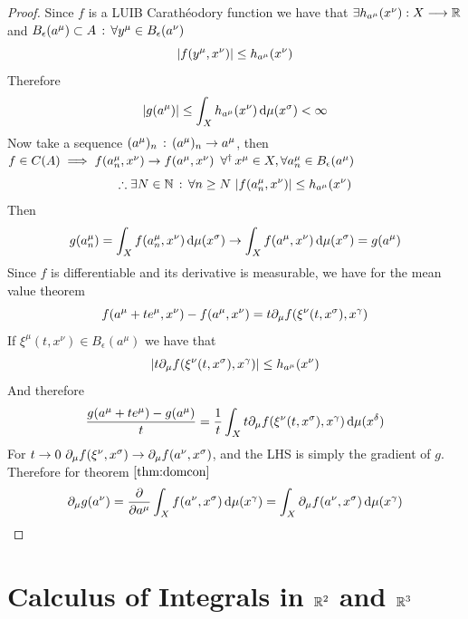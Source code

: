 \documentclass[../complete.tex]{subfiles}
\begin{document}
\begin{proof}
	Since $f$ is a LUIB Carathéodory function we have that $\exists h_{a^\mu}(x^\nu):X\overset{}{\longrightarrow}\mathbb{R}$ and $B_\epsilon(a^\mu)\subset A\, :\, \forall y^\mu\in B_\epsilon(a^\nu)$
	\begin{equation*}
		\abs{f(y^\mu,x^\nu)}\le h_{a^\mu}(x^\nu)
	\end{equation*}
	Therefore
	\begin{equation*}
		\abs{g(a^\mu)}\le\int_{X}^{}h_{a^\mu}(x^\nu)\operatorname{d\!}\mu(x^\sigma)<\infty
	\end{equation*}
	Now take a sequence $(a^\mu)_n\, :\,  (a^\mu)_n\to a^\mu$, then $f\in C(A)\implies{} f(a^\mu_n,x^\nu)\to f(a^\mu,x^\nu)\ \operatorname{\forall^\dagger} x^\mu\in X,\forall a^\mu_n\in B_\epsilon(a^\mu)$
	\begin{equation*}
		\therefore\exists N\in\N\st\forall n\ge N\ \abs{f(a^\mu_n,x^\nu)}\le h_{a^\mu}(x^\nu)
	\end{equation*}
	Then
	\begin{equation*}
		g(a^\mu_n)=\int_{X}^{}f(a^\mu_n,x^\nu)\operatorname{d\!}\mu(x^\sigma)\to\int_{X}^{}f(a^\mu,x^\nu)\operatorname{d\!}\mu(x^\sigma)=g(a^\mu)
	\end{equation*}
	Since $f$ is differentiable and its derivative is measurable, we have for the mean value theorem
	\begin{equation*}
		f(a^\mu+te^\mu,x^\nu)-f(a^\mu,x^\nu)=t\partial_\mu f(\xi^\nu(t,x^\sigma),x^\gamma)
	\end{equation*}
	If $\xi^\mu(t,x^\nu)\in B_\epsilon(a^\mu)$ we have that
	\begin{equation*}
		\abs{t\partial_\mu f(\xi^\nu(t,x^\sigma),x^\gamma)}\le h_{a^\mu}(x^\nu)
	\end{equation*}
	And therefore
	\begin{equation*}
		\frac{g(a^\mu+te^\mu)-g(a^\mu)}{t}=\frac{1}{t}\int_{X}^{}t\partial_\mu f(\xi^\nu(t,x^\sigma),x^\gamma)\operatorname{d\!}\mu(x^\delta)
	\end{equation*}
	For $t\to0\ \partial_\mu f(\xi^\nu,x^\sigma)\to\partial_\mu f(a^\nu,x^\sigma)$, and the LHS is simply the gradient of $g$. Therefore for theorem $\eqref{thm:domcon}$
	\begin{equation*}
		\partial_\mu g(a^\nu)=\pdv{a^\mu}\int_{X}f(a^\nu,x^\sigma)\operatorname{d\!}\mu(x^\gamma)=\int_{X}^{}\partial_{\mu}f(a^\nu,x^\sigma)\operatorname{d\!}\mu(x^\gamma)
	\end{equation*}
\end{proof}
\section{Calculus of Integrals in $\mathbb{R}^2$ and $\mathbb{R}^3$}
\end{document}
